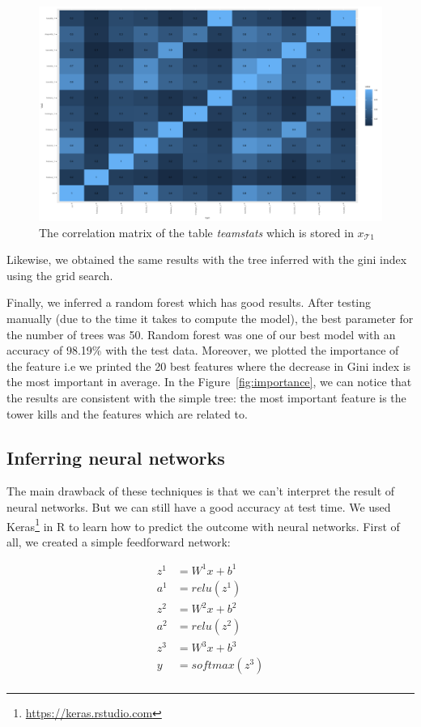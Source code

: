 \documentclass{article}
\begin{document}
\begin{figure}[!hb]
  \includegraphics[scale=0.2]{cor1.png}
  \centering
  \caption{The correlation matrix of the table \emph{teamstats} which is stored in $x_{\mathcal{T}1}$}
  \label{fig:cor1}
\end{figure}

Likewise, we obtained the same results with the tree inferred with the gini index using the grid search.

Finally, we inferred a random forest which has good results. After testing manually (due to the time it takes to compute the model), the best parameter for the number of trees was 50. Random forest was one of our best model with an accuracy of 98.19\% with the test data. Moreover, we plotted the importance of the feature i.e we printed the 20 best features where the decrease in Gini index is the most important in average. In the Figure~\ref{fig:importance}, we can notice that the results are consistent with the simple tree: the most important feature is the tower kills and the features which are related to. 

\subsection{Inferring neural networks}

The main drawback of these techniques is that we can't interpret the result of neural networks. But we can still have a good accuracy at test time. We used Keras\footnote{\url{https://keras.rstudio.com}} in R to learn how to predict the outcome with neural networks. First of all, we created a simple feedforward network:

\begin{align*}
z^{1} &= W^{1}x+b^{1}\\
a^{1} &= relu(z^{1})\\
z^{2} &= W^{2}x+b^{2}\\
a^{2} &= relu(z^{2})\\
z^{3} &= W^{3}x+b^{3}\\
y &= softmax(z^{3})\\
\end{align*}
\end{document}
